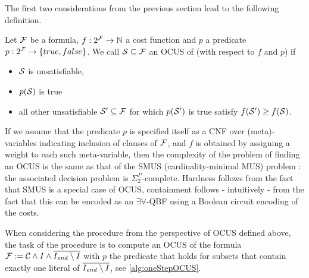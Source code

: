 The first two considerations from the previous section lead to the following definition. 

\begin{definition}
   Let $\mathcal{F} $ be a formula, $f:2^{\mathcal{F} } \to \mathbb{N}$ a cost function and  $p$ a predicate $p: 2^{\mathcal{F} }\to \{true,false\}$.  We call %
    $\mathcal{S} \subseteq \mathcal{F} $ an OCUS of \formula (with respect to $f$ and $p$) if \begin{itemize}                                      
      \item $\mathcal{S}$ is unsatisfiable,
      \item $p(\mathcal{S})$ is true
      \item all other unsatisfiable $\mathcal{S}'\subseteq \mathcal{F} $ for which $p(\mathcal{S}')$ is true satisfy $f(\mathcal{S}')\geq f(\mathcal{S})$.
    \end{itemize}
\end{definition}


If we assume that the predicate $p$ is specified itself as a CNF over (meta)-variables indicating inclusion of clauses of $\mathcal{F}$, and $f$ is obtained by assigning a weight to each such meta-variable, then the complexity of the problem of finding an OCUS is the same as that of the SMUS (cardinality-minimal MUS) problem  \cite{ignatiev2015smallest}: the associated decision problem is $\Sigma^P_2$-complete. Hardness follows from the fact that SMUS is a special case of OCUS, containment follows - intuitively - from the fact that this can be encoded as an $\exists\forall$-QBF using a Boolean circuit encoding of the costs. 

When considering the procedure \onestep from the perspective of OCUS defined above, the task of the procedure  is to compute an OCUS of the formula $\mathcal{F}  := \mathcal{C} \land I\land \overline{I_\mathit{end} \setminus I}$ with $p$ the predicate that holds for subsets  that contain exactly one literal of $\overline{I_\mathit{end} \setminus I}$, see \cref{alg:oneStepOCUS}. 

